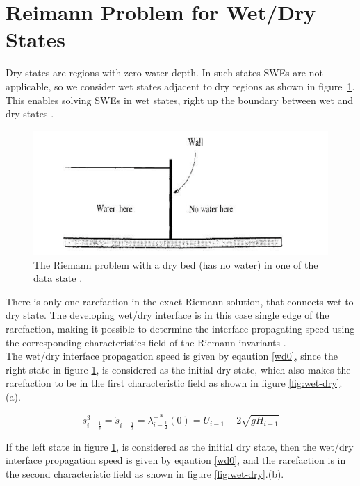 \documentclass[12pt,a4paper]{article}
\begin{document}
	\section{Reimann Problem for Wet/Dry States}
	
	Dry states are regions with zero water depth. In such states SWEs are not applicable, so we consider wet states adjacent to dry regions as shown in figure~\ref{fig:dry-bed}. This enables solving SWEs in wet states, right up the boundary between wet and dry states \citep{toro2001shock}.
	\begin{figure}[H]
		\centering
		\includegraphics[width=0.7\linewidth]{images/dry-bed}
		\caption{ The Riemann problem with a dry bed (has no water) in one of the data state \cite{toro2001shock}.}
		\label{fig:dry-bed}
	\end{figure}
	
	\noindent There is only one rarefaction in the exact Riemann solution, that connects wet to dry state. The developing wet/dry interface is in this case single edge of the rarefaction, making it possible to determine the interface propagating speed using the corresponding characteristics field of the Riemann invariants \cite{ge:2008}.\\ 
	
	\noindent The wet/dry interface propagation  speed  is given by eqaution \eqref{wd0}, since the right state in figure \ref{fig:dry-bed}, is considered as the initial dry state, which also makes the rarefaction to be in the first characteristic field as shown in figure \ref{fig:wet-dry}.(a).
	
	\begin{equation}
		s_{i-\frac{1}{2}}^{3} = \check{s}_{i-\frac{1}{2}}^{+} = \lambda_{i-\frac{1}{2}}^{-*}(0)= U_{i-1} - 2\sqrt{gH_{i-1}}
		\label{wd0}
	\end{equation}
	
	\noindent If the left state in figure \ref{fig:dry-bed}, is considered as the initial dry state, then the  wet/dry interface propagation  speed  is given by eqaution \eqref{wd0}, and the  rarefaction is in the second characteristic field  as shown in figure \ref{fig:wet-dry}.(b).
	
\end{document}
